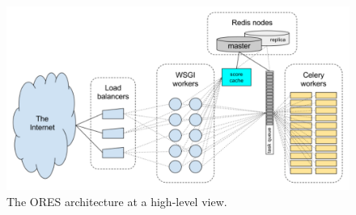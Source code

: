 \begin{figure}[h]
  \centering
  \includegraphics[width=.95\textwidth]{figures/ORES_architecture}
  \caption{The ORES architecture at a high-level view.}
  \label{fig:ores_architecture}
\end{figure}
